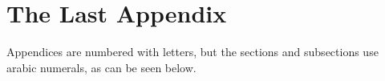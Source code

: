 \chapter{The Last Appendix}
\label{app:n}
Appendices are numbered with letters, but the sections and subsections use
arabic numerals, as can be seen below.

%
%


